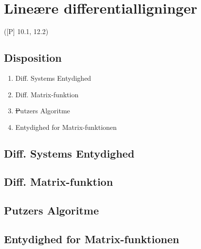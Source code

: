 \newpage
\chapter{Lineære differentialligninger}
([P] 10.1, 12.2)

\section*{Disposition}
\begin{enumerate}
	\item Diff. Systems Entydighed
	\item Diff. Matrix-funktion
	\item \sout Putzers Algoritme
	\item Entydighed for Matrix-funktionen 
\end{enumerate}

\section{Diff. Systems Entydighed}


\section{Diff. Matrix-funktion}


\section*{Putzers Algoritme}


\section{Entydighed for Matrix-funktionen}


